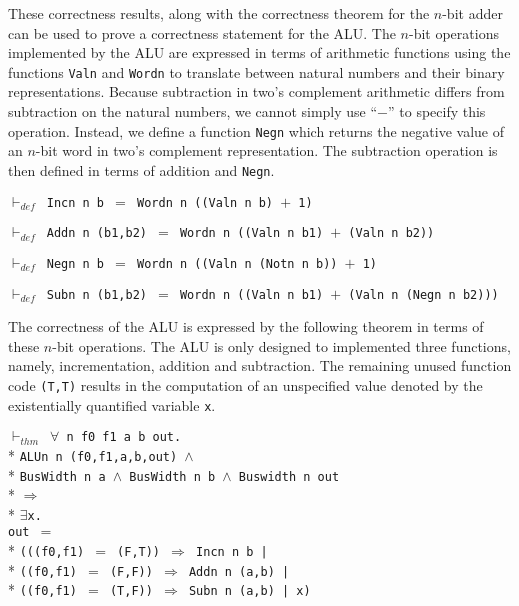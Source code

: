\begin{normalsize}
These correctness results, along with the correctness theorem for
the \mbox{$n$-bit} adder can be used to prove a correctness statement
for the ALU.
The \mbox{$n$-bit} operations implemented by the ALU are expressed
in terms of arithmetic functions using the functions
\verb"Valn" and \verb"Wordn" to translate between natural numbers and
their binary representations.
Because subtraction in two's complement arithmetic differs
from subtraction on the natural numbers,
we cannot simply use ``$-$'' to specify this operation.
Instead, we define a function \verb"Negn"
which returns the negative value of an \mbox{$n$-bit} word
in two's complement representation.  The subtraction operation
is then defined in terms of addition and \verb"Negn".

$\vdash_{def}$\verb" Incn n b "$=$\verb" Wordn n ((Valn n b) "$+$\verb" 1)"

$\vdash_{def}$\verb" Addn n (b1,b2) "$=$\verb" Wordn n ((Valn n b1) "$+$\verb" (Valn n b2))"

$\vdash_{def}$\verb" Negn n b "$=$\verb" Wordn n ((Valn n (Notn n b)) "$+$\verb" 1)"

$\vdash_{def}$\verb" Subn n (b1,b2) "$=$\verb" Wordn n ((Valn n b1) "$+$\verb" (Valn n (Negn n b2)))"

The correctness of the
ALU is expressed by the following theorem
in terms of these \mbox{$n$-bit} operations.
The ALU is only designed to implemented three functions, namely,
incrementation, addition and subtraction.
The remaining unused function code \verb"(T,T)" results in the computation
of an unspecified value denoted by the existentially quantified variable
\verb"x".

\begin{minipage}{17cm}
$\vdash_{thm}$\verb" "$\forall$\verb" n f0 f1 a b out."\\*
\verb"ALUn n (f0,f1,a,b,out) "$\wedge$\\*
\verb"BusWidth n a "$\wedge$\verb" BusWidth n b "$\wedge$\verb" Buswidth n out"\\*
$\Longrightarrow$\\*
$\exists$\verb"x."\\
\verb"out "$=$\\*
\verb"(((f0,f1) "$=$\verb" (F,T)) "$\Rightarrow$\verb" Incn n b |"\\*
\verb"((f0,f1) "$=$\verb" (F,F)) "$\Rightarrow$\verb" Addn n (a,b) |"\\*
\verb"((f0,f1) "$=$\verb" (T,F)) "$\Rightarrow$\verb" Subn n (a,b) | x)"
\end{minipage}


\end{normalsize}

